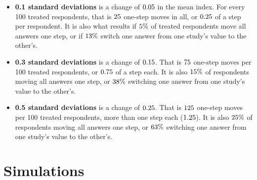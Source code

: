 \documentclass[11pt]{article}
\begin{document}
\begin{itemize}
  \item \textbf{0.1 standard deviations} is a change of $0.05$ in the mean index. For every 100
  treated respondents, that is $25$ one-step moves in all, or $0.25$ of a step per
  respondent. It is also what results if $5\%$ of treated respondents move all \KWord{} answers
  one step, or if $13\%$ switch one answer from one study's value to the other's.
  \item \textbf{0.3 standard deviations} is a change of $0.15$. That is $75$ one-step
  moves per 100 treated respondents, or $0.75$ of a step each. It is also $15\%$ of
  respondents moving all \KWord{} answers one step, or $38\%$ switching one answer from one study's
  value to the other's.
  \item \textbf{0.5 standard deviations} is a change of $0.25$. That is $125$ one-step
  moves per 100 treated respondents, more than one step each ($1.25$). It is also
  $25\%$ of respondents moving all \KWord{} answers one step, or $63\%$ switching one
  answer from one study's value to the other's.
\end{itemize}

\begin{table}[!htbp]
  \centering
  \small
  
  \caption{Five standardized effects in the lean index's own units, with the simulated index
  standard deviation of $\SDIndex$. A one-step move takes one answer from neutral to a study's
  value, or from the other study's value to neutral. The last column is
  $N^{*}_{\text{main}}$ from~\eqref{eq:nstar}.}
  \label{tab:mag}
\end{table}

\section{Simulations}\label{sec:sim}
\end{document}
